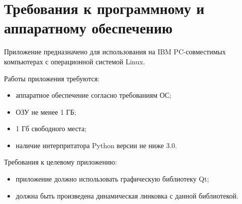 \section{Требования к программному и аппаратному обеспечению}

Приложение предназначено для использования на IBM PC-совместимых компьютерах с
операционной системой Linux.

Работы приложения требуются:

\begin{itemize}
	\item аппаратное обеспечение согласно требованиям ОС;
	\item ОЗУ не менее 1 ГБ;
	\item 1 Гб свободного места;
	\item наличие интерпритатора Python версии не ниже 3.0.
\end{itemize}

Требования к целевому приложению:

\begin{itemize}
	\item приложение должно использовать графическую библиотеку Qt;
	\item должна быть произведена динамическая линковка с данной библиотекой.
\end{itemize}

